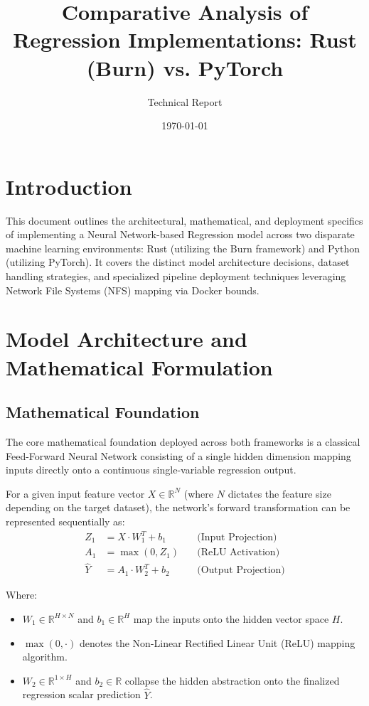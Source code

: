\documentclass[12pt]{article}
\title{\textbf{Comparative Analysis of Regression Implementations: Rust (Burn) vs. PyTorch}}
\author{Technical Report}
\date{\today}
\begin{document}
 

\maketitle
\tableofcontents
\newpage

\section{Introduction}
This document outlines the architectural, mathematical, and deployment specifics of implementing a Neural Network-based Regression model across two disparate machine learning environments: Rust (utilizing the Burn framework) and Python (utilizing PyTorch). It covers the distinct model architecture decisions, dataset handling strategies, and specialized pipeline deployment techniques leveraging Network File Systems (NFS) mapping via Docker bounds.

\section{Model Architecture and Mathematical Formulation}

\subsection{Mathematical Foundation}
The core mathematical foundation deployed across both frameworks is a classical Feed-Forward Neural Network consisting of a single hidden dimension mapping inputs directly onto a continuous single-variable regression output.

For a given input feature vector $X \in \mathbb{R}^N$ (where $N$ dictates the feature size depending on the target dataset), the network's forward transformation can be represented sequentially as:
\begin{align}
    Z_1 &= X \cdot W_1^T + b_1 \quad &\text{(Input Projection)} \\
    A_1 &= \max(0, Z_1)        \quad &\text{(ReLU Activation)} \\
    \hat{Y} &= A_1 \cdot W_2^T + b_2 \quad &\text{(Output Projection)}
\end{align}

Where:
\begin{itemize}
    \item $W_1 \in \mathbb{R}^{H \times N}$ and $b_1 \in \mathbb{R}^H$ map the inputs onto the hidden vector space $H$.
    \item $\max(0, \cdot)$ denotes the Non-Linear Rectified Linear Unit (ReLU) mapping algorithm.
    \item $W_2 \in \mathbb{R}^{1 \times H}$ and $b_2 \in \mathbb{R}$ collapse the hidden abstraction onto the finalized regression scalar prediction $\hat{Y}$.
\end{itemize}
\end{document}
